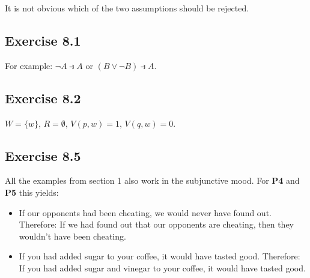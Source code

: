 \documentclass{scrartcl}
\begin{document}
  It is not obvious which of the two assumptions should be rejected.

  \subsection*{Exercise 8.1}

%
%
  For example: $\neg A \strictif A$ or $(B\lor \neg B) \strictif A$.

  \subsection*{Exercise 8.2}

%
%
  $W = \{ w \}$, $R = \emptyset$, $V(p,w)=1$, $V(q,w)=0$.

  \subsection*{Exercise 8.5}

%
%
  All the examples from section 1 also work in the subjunctive mood. For
  \textbf{P4} and \textbf{P5} this yields:
  \begin{itemize}
  \item If our opponents had been cheating, we would never have found out.
    Therefore: If we had found out that our opponents are cheating, then
    they wouldn't have been cheating.
  \item If you had added sugar to your coffee, it would have tasted
    good. Therefore: If you had added sugar and vinegar to your coffee, it would
    have tasted good.
  \end{itemize}
\end{document}
